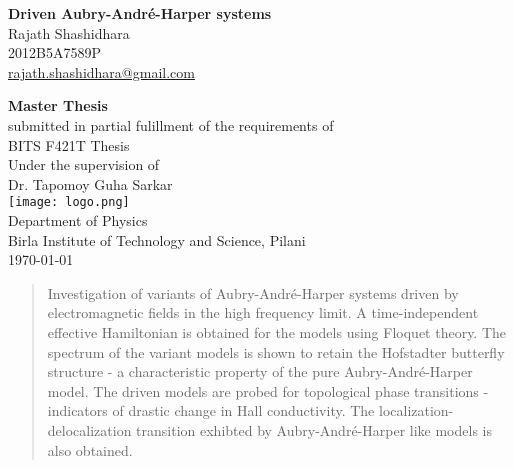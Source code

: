 %

\begin{titlepage}
  \begin{center}
    \vspace*{1cm}
    
    \LARGE
    \textbf{Driven Aubry-Andr\'e-Harper systems}
    \vspace{1.5cm}
    \large
    \\ Rajath Shashidhara\\    
    2012B5A7589P\\ \normalsize
    \url{rajath.shashidhara@gmail.com}
    
    \vspace{3.5cm}
    \large
    \textbf{Master Thesis} \\
    \vspace{0.4cm}
    submitted in partial fulillment of the requirements of\\
    BITS F421T Thesis\\
    
    \normalsize
    \vspace{2.5cm}
    Under the supervision of\\
    \vspace{0.2cm}
    \large
    Dr. Tapomoy Guha Sarkar\\
    
    \normalsize
    \vfill
    \texttt{[image: logo.png]}
    \vspace{0.5cm}\\
    Department of Physics\\
    Birla Institute of Technology and Science, Pilani\\
    \today
  \end{center}
\end{titlepage}

\normalsize

\newpage
\thispagestyle{empty}

\begin{abstract}
Investigation of variants of Aubry-Andr\'e-Harper systems driven by electromagnetic fields in the high frequency limit. A time-independent effective
Hamiltonian is obtained for the models using Floquet theory. The spectrum of the variant models is shown to retain the Hofstadter butterfly structure - a
characteristic property of the pure Aubry-Andr\'e-Harper model. The driven models are probed for topological phase transitions - indicators of drastic change in
Hall conductivity. The localization-delocalization transition exhibted by Aubry-Andr\'e-Harper like models is also obtained.
\end{abstract}

